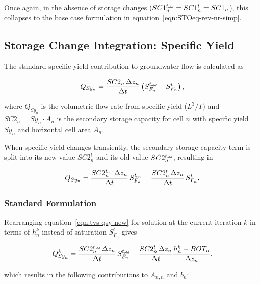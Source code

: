 \noindent Once again, in the absence of storage changes ($SC1_n^{t_\mathit{\kern -0.07em old}} = SC1_n^t = SC1_n$), this collapses to the base case formulation in equation~\ref{eqn:STOeq-rev-nr-simp}.



\subsection{Storage Change Integration: Specific Yield} \label{sec:sci-sy}

The standard \mf specific yield contribution to groundwater flow \citep[eq. 5--10]{modflow6gwf} is calculated as

\begin{equation}
	\label{eqn:tvs-qsy-original}
	Q_{Sy_n} = \frac{SC2_n \, \Delta z_n}{\Delta t} \left( S_{F_n}^{t_\mathit{\kern -0.07em old}} - S_{F_n}^t \right) ,
\end{equation}

\noindent where $Q_{Sy_n}$ is the volumetric flow rate from specific yield ($L^3/T$) and $SC2_n = Sy_n \cdot A_n$ is the secondary storage capacity for cell $n$ with specific yield $Sy_n$ and horizontal cell area $A_n$.

When specific yield changes transiently, the secondary storage capacity term is split into its new value $SC2_n^t$ and its old value $SC2_n^{t_\mathit{\kern -0.07em old}}$, resulting in

\begin{equation}
	\label{eqn:tvs-qsy-new}
	Q_{Sy_n} = \frac{SC2_n^{t_\mathit{\kern -0.07em old}} \, \Delta z_n}{\Delta t} \, S_{F_n}^{t_\mathit{\kern -0.07em old}} - \frac{SC2_n^t \, \Delta z_n}{\Delta t} \, S_{F_n}^t .
\end{equation}


\subsubsection{Standard Formulation}

Rearranging equation~\ref{eqn:tvs-qsy-new} for solution at the current iteration $k$ in terms of $h_n^k$ instead of saturation $S_{F_n}^t$ gives

\begin{equation}
	\label{eqn:tvs-qsy-new-k}
	Q_{Sy_n}^k = \frac{SC2_n^{t_\mathit{\kern -0.07em old}} \, \Delta z_n}{\Delta t} \, S_{F_n}^{t_\mathit{\kern -0.07em old}} - \frac{SC2_n^t \, \Delta z_n}{\Delta t} \frac{h_n^k - BOT_n}{\Delta z_n} ,
\end{equation}

\noindent which results in the following contributions to $A_{n,n}$ and $b_n$:

